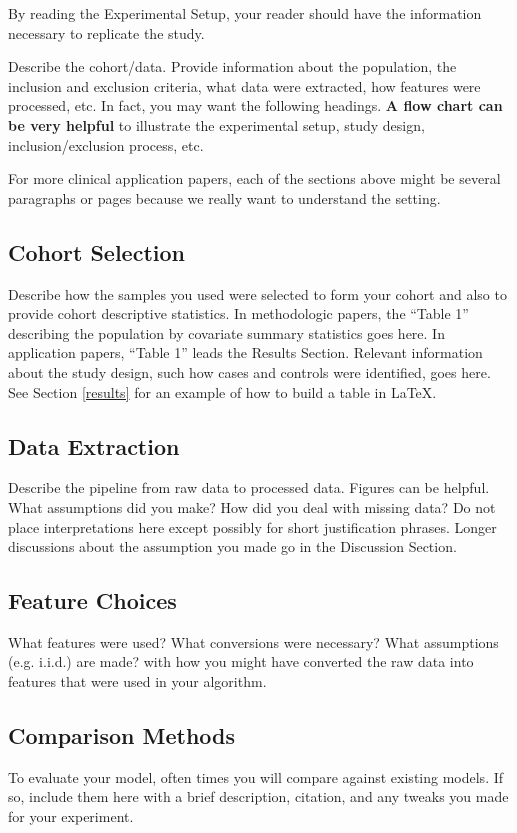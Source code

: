 \documentclass[twoside,11pt]{article}
\begin{document}
By reading the Experimental Setup, your reader should have the information necessary to replicate the study.

Describe the cohort/data. Provide information about the population, the inclusion and exclusion criteria, what data were extracted, how features were processed, etc. In fact, you may want the following headings. \textbf{A flow chart can be very helpful} to illustrate the experimental setup, study design, inclusion/exclusion process, etc.

For more clinical application papers, each of the sections above might be several paragraphs or pages because we really want to understand the setting.

\subsection{Cohort Selection} 
Describe how the samples you used were selected to form your cohort and also to provide cohort descriptive statistics. In methodologic papers, the ``Table 1'' describing the population by covariate summary statistics goes here. In application papers, ``Table 1'' leads the Results Section. Relevant information about the study design, such how cases and controls were identified, goes here. See Section \ref{results} for an example of how to build a table in LaTeX.

\subsection{Data Extraction} 
Describe the pipeline from raw data to processed data. Figures can be helpful. What assumptions did you make? How did you deal with missing data? Do not place interpretations here except possibly for short justification phrases. Longer discussions about the assumption you made go in the Discussion Section.

\subsection{Feature Choices} 
What features were used? What conversions were necessary? What assumptions (e.g. i.i.d.) are made? with how you might have converted the raw data into features that were used in your algorithm. 

\subsection{Comparison Methods}
To evaluate your model, often times you will compare against existing models.
If so, include them here with a brief description, citation, and any tweaks you made for your experiment.
\end{document}
